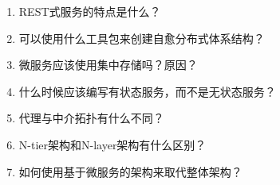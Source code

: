 \begin{enumerate}
\item
REST式服务的特点是什么？

\item
可以使用什么工具包来创建自愈分布式体系结构？

\item
微服务应该使用集中存储吗？原因？

\item
什么时候应该编写有状态服务，而不是无状态服务？

\item
代理与中介拓扑有什么不同？

\item
N-tier架构和N-layer架构有什么区别？

\item
如何使用基于微服务的架构来取代整体架构？
\end{enumerate}